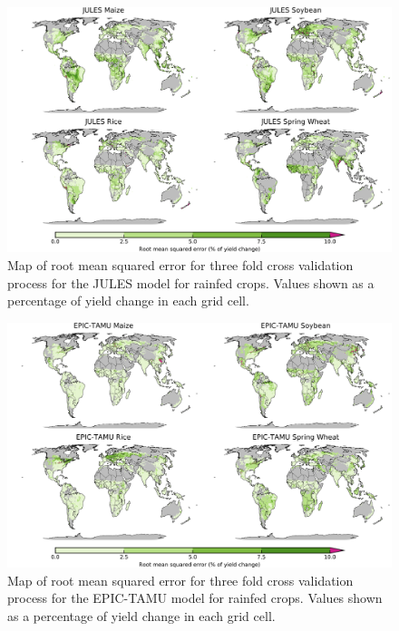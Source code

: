\documentclass[12pt]{article}
\begin{document}
{{\begin{figure}[h!]
  \centering
  \includegraphics[width=15.5cm]{JULES_spatial_MSE_ton_ha.png}
  \caption{Map of root mean squared error for three fold cross validation process for the JULES model for rainfed crops. Values shown as a percentage of yield change in each grid cell.}
\end{figure}

\begin{figure}[h!]
  \centering
  \includegraphics[width=15.5cm]{EPIC-TAMU_spatial_MSE_ton_ha.png}
  \caption{Map of root mean squared error for three fold cross validation process for the EPIC-TAMU model for rainfed crops. Values shown as a percentage of yield change in each grid cell.}
\end{figure}

}}
\end{document}
